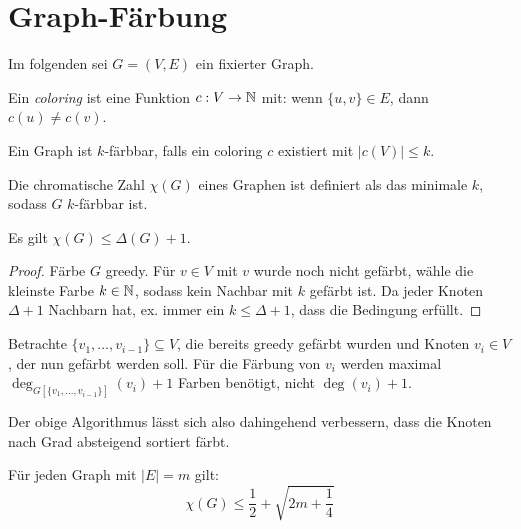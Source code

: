 \chapter{Graph-Färbung}

Im folgenden sei $ G = (V, E) $ ein fixierter Graph.

\begin{definition}[Coloring]
    Ein \textit{coloring} ist eine Funktion $ c : V \rightarrow \mathbb{N} $ mit: wenn $ \{ u, v \} \in E $, dann $ c(u) \ne c(v) $.
\end{definition}

\begin{definition}[$ k $-Färbung]
    Ein Graph ist $ k $-färbbar, falls ein coloring $ c $ existiert mit $ |c(V)| \leq k $.
\end{definition}

\begin{definition}
    Die chromatische Zahl $ \chi(G) $ eines Graphen ist definiert als das minimale $ k $, sodass $ G $ $ k $-färbbar ist.
\end{definition}

\begin{theorem}
    \label{thm:delta-coloring}
    Es gilt $ \chi(G) \leq \Delta(G) + 1 $.
\end{theorem}

\begin{proof}
    Färbe $ G $ greedy.
    Für $ v \in V $ mit $ v $ wurde noch nicht gefärbt, wähle die kleinste Farbe $ k \in \mathbb{N} $, sodass kein Nachbar mit $ k $ gefärbt ist.
    Da jeder Knoten $ \Delta + 1 $ Nachbarn hat, ex. immer ein $ k \leq \Delta + 1 $, dass die Bedingung erfüllt.
\end{proof}

\begin{remark}
    Betrachte $ \{ v_1, \dots, v_{i - 1} \} \subseteq V $, die bereits greedy gefärbt wurden und Knoten $ v_i \in V $, der nun gefärbt werden soll.
    Für die Färbung von $ v_i $ werden maximal $ \deg_{G[\{ v_1, \dots, v_{i - 1} \}]}(v_i) + 1 $ Farben benötigt, nicht $ \deg(v_i) + 1 $.

    Der obige Algorithmus lässt sich also dahingehend verbessern, dass die Knoten nach Grad absteigend sortiert färbt.
\end{remark}

\begin{theorem}
    Für jeden Graph mit $ |E| = m $ gilt:
    \begin{equation*}
        \chi(G) \leq \frac{1}{2} + \sqrt{2m + \frac{1}{4}}
    \end{equation*}
\end{theorem}

